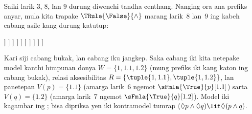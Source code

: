 \documentclass[../../../include/open-logic-section]{subfiles}
\begin{document}
{\begin{ex}
  Saiki larik 3, 8, lan 9 durung diwenehi tandha centhang. Nanging
  ora ana prefiks anyar, mula kita trapake $\TRule{\False}{\land}$
  marang larik~8 lan~9 ing kabeh cabang asile kang durung katutup:
  \begin{oltableau}
    [\pFmla{\False}{(\Diamond p \land \Diamond q) \lif \Diamond(p \land q)}{1},
      just = \TAss, checked
      [\pFmla{\True}{\Diamond p \land \Diamond q}{1},
        just = {\TRule{\False}{\lif}[1]}, checked
        [\pFmla{\False}{\Diamond(p \land q)}{1},
          just = {\TRule{\False}{\lif}[1]}, checked
          [\pFmla{\True}{\Diamond p}{1},
            just = {\TRule{\True}{\land}[2]}, checked
            [\pFmla{\True}{\Diamond q}{1},
              just = {\TRule{\True}{\land}[2]}, checked
              [\pFmla{\True}{p}{1.1}, 
                just = {\TRule{\True}{\Diamond}[4]}, checked
                [\pFmla{\True}{q}{1.2}, 
                  just = {\TRule{\True}{\Diamond}[5]}, checked
                  [\pFmla{\False}{p \land q}{1.1}, 
                    just = {\TRule{\False}{\Diamond}[3]}, checked
                    [\pFmla{\False}{p \land q}{1.2}, 
                      just = {\TRule{\False}{\Diamond}[3]}, checked
                      [\pFmla{\False}{p}{1.1},
                        just = {\TRule{\False}{\land}[8]}, checked, close
                      ]
                      [\pFmla{\False}{q}{1.1},
                        just = {\TRule{\False}{\land}[8]}, checked
                        [\pFmla{\False}{p}{1.2},
                          just = {\TRule{\False}{\land}[9]}, checked]
                        [\pFmla{\False}{q}{1.2},
                          just = {\TRule{\False}{\land}[9]}, checked, close]
                      ]
                    ]
                  ]
                ]
              ]
            ]
          ]
        ]
      ]
    ]
  \end{oltableau}
  Kari siji cabang bukak, lan cabang iku jangkep. Saka cabang iki
  kita netepake model kanthi himpunan donya $W = \{1, 1.1, 1.2\}$
  (mung prefiks iki kang katon ing cabang bukak), relasi
  aksesibilitas $R = \{\tuple{1, 1.1}, \tuple{1, 1.2}\}$, lan
  panetepan $V(p) = \{1.1\}$ (amarga larik~6 ngemot
  $\sFmla{\True}{p}[1.1]$) sarta $V(q) = \{1.2\}$ (amarga larik~7
  ngemot $\sFmla{\True}{q}[1.2]$). Model iki kagambar ing
  ; bisa dipriksa yen iki kontramodel tumrap
  $(\Diamond p \land \Diamond q) \lif \Diamond (p \land q)$.
  \begin{figure}
  \begin{center}
    \begin{tikzpicture}[modal]

\end{tikzpicture}
\end{center}
\end{figure}
\end{ex}}
\end{document}
